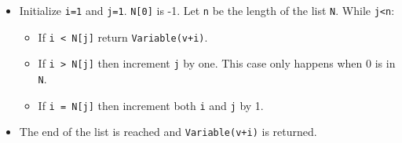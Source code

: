 \begin{itemize}
\item
Initialize \texttt{i=1} and \texttt{j=1}. \texttt{N[0]} is -1. Let \texttt{n} be the length of the list \texttt{N}. While \texttt{j<n}:
	\begin{itemize}
		\item
		If \texttt{i < N[j]} return \texttt{Variable(v+i)}.
		\item
		If \texttt{i > N[j]} then increment \texttt{j} by one. This case only happens when 0 is in \texttt{N}.
		\item
		If \texttt{i = N[j]} then increment both \texttt{i} and \texttt{j} by 1.
	\end{itemize}
\item
The end of the list is reached and \texttt{Variable(v+i)} is returned.
\end{itemize}

